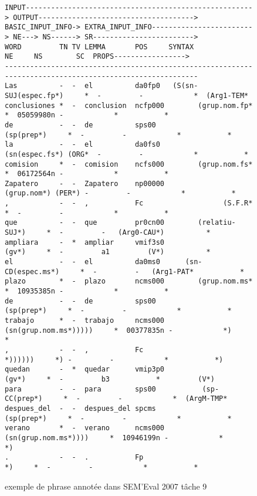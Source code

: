 \documentclass[PhD-Yoann-Dupont.tex]{subfiles}
\begin{document}
\begin{figure}[ht!]
\center
\scriptsize
\begin{verbatim}
INPUT------------------------------------------------------> OUTPUT------------------------------------->
BASIC_INPUT_INFO-> EXTRA_INPUT_INFO------------------------> NE---> NS------> SR------------------------>
WORD         TN TV LEMMA       POS     SYNTAX                NE     NS        SC  PROPS----------------->
---------------------------------------------------------------------------------------------------------
Las          -  -  el          da0fp0   (S(sn-SUJ(espec.fp*)     *  -         -            *  (Arg1-TEM*
conclusiones *  -  conclusion  ncfp000        (grup.nom.fp*      *  05059980n -            *           *
de           -  -  de          sps00              (sp(prep*)     *  -         -            *           *
la           -  -  el          da0fs0         (sn(espec.fs*) (ORG*  -         -            *           *
comision     *  -  comision    ncfs000        (grup.nom.fs*      *  06172564n -            *           *
Zapatero     -  -  Zapatero    np00000           (grup.nom*) (PER*) -         -            *           *
,            -  -  ,           Fc                   (S.F.R*      *  -         -            *           *
que          -  -  que         pr0cn00        (relatiu-SUJ*)     *  -         -   (Arg0-CAU*)          *
ampliara     -  *  ampliar     vmif3s0                 (gv*)     *  -         a1         (V*)          *
el           -  -  el          da0ms0      (sn-CD(espec.ms*)     *  -         -   (Arg1-PAT*           *
plazo        *  -  plazo       ncms000        (grup.nom.ms*      *  10935385n -            *           *
de           -  -  de          sps00              (sp(prep*)     *  -         -            *           *
trabajo      *  -  trabajo     ncms000 (sn(grup.nom.ms*)))))     *  00377835n -            *)          *
,            -  -  ,           Fc                    *))))))     *) -         -            *           *)
quedan       -  *  quedar      vmip3p0                 (gv*)     *  -         b3           *         (V*)
para         -  -  para        sps00           (sp-CC(prep*)     *  -         -            *  (ArgM-TMP*
despues_del  -  -  despues_del spcms              (sp(prep*)     *  -         -            *           *
verano       *  -  verano      ncms000  (sn(grup.nom.ms*))))     *  10946199n -            *           *)
.            -  -  .           Fp                         *)     *  -         -            *           *\end{verbatim}
\caption{exemple de phrase annotée dans SEM'Eval 2007 tâche 9}
\label{fig:semeval2007-example}
\end{figure}
\end{document}
